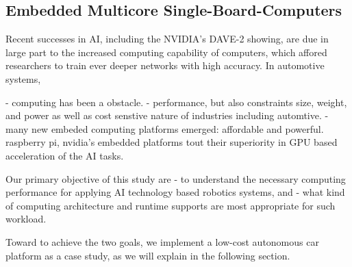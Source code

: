 



\subsection{Embedded Multicore Single-Board-Computers}

Recent successes in AI, including the NVIDIA's DAVE-2 showing, are due
in large part to the increased computing capability of computers,
which affored researchers to train ever deeper networks with high
accuracy. In automotive systems, 

- computing has been a obstacle.
- performance, but also constraints size, weight, and power as well as
cost senstive nature of industries including automtive.
- many new embeded computing platforms emerged: affordable and
powerful. raspberry pi, nvidia's embedded platforms tout their
superiority in GPU based acceleration of the AI tasks.

Our primary objective of this study are
- to understand the necessary computing performance for applying AI
technology based robotics systems, and 
- what kind of computing architecture and runtime supports
are most appropriate for such workload.

Toward to achieve the two goals, we implement a low-cost autonomous
car platform as a case study, as we will explain in the following
section. 
